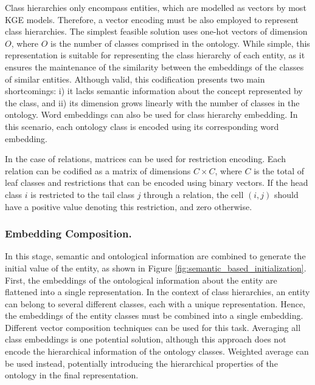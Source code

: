 Class hierarchies only encompass entities, which are modelled as vectors by most KGE models. Therefore, a vector encoding must be also employed to represent class hierarchies. The simplest feasible solution uses one-hot vectors of dimension $O$, where $O$ is the number of classes comprised in the ontology. While simple, this representation is suitable for representing the class hierarchy of each entity, as it ensures the maintenance of the similarity between the embeddings of the classes of similar entities. Although valid, this codification presents two main shortcomings: i) it lacks semantic information about the concept represented by the class, and ii) its dimension grows linearly with the number of classes in the ontology. Word embeddings can also be used for class hierarchy embedding. In this scenario, each ontology class is encoded using its corresponding word embedding.

In the case of relations, matrices can be used for restriction encoding. Each relation can be codified as a matrix of dimensions $C \times C$, where $C$ is the total of leaf classes and restrictions that can be encoded using binary vectors. If the head class $i$ is restricted to the tail class $j$ through a relation, the cell $(i,j)$ should have a positive value denoting this restriction, and zero otherwise.



\subsubsection{Embedding Composition.} \label{subsec:s4_embedding_compo}
In this stage, semantic and ontological information are combined to generate the initial value of the entity, as shown in Figure \ref{fig:semantic_based_initialization}. First, the embeddings of the ontological information about the entity are flattened into a single representation. In the context of class hierarchies, an entity can belong to several different classes, each with a unique representation. Hence, the embeddings of the entity classes must be combined into a single embedding. Different vector composition techniques can be used for this task. Averaging all class embeddings is one potential solution, although this approach does not encode the hierarchical information of the ontology classes. Weighted average can be used instead, potentially introducing the hierarchical properties of the ontology in the final representation.

